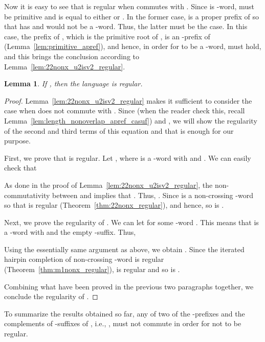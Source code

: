 \documentclass{article}
\theoremstyle{plain}
\newtheorem{lemma}{Lemma}
\theoremstyle{remark}
\begin{document}
Now it is easy to see that  is regular when  commutes with . 
Since  is -word,  must be primitive and  is equal to either  or . 
In the former case,  is a proper prefix of  so that  has  and would not be a -word. 
Thus, the latter must be the case. 
In this case, the prefix  of , which is the primitive root of , is an -prefix of  (Lemma~\ref{lem:primitive_apref}), and hence, in order for  to be a -word,  must hold, and this brings the conclusion according to Lemma~\ref{lem:22nonx_u2isv2_regular}. 

\begin{lemma}
	If , then the language  is regular. 
\end{lemma}
\begin{proof}
	Lemma~\ref{lem:22nonx_u2isv2_regular} makes it sufficient to consider the case when  does not commute with . 
	Since  (when the reader check this, recall Lemma~\ref{lem:length_nonoverlap_apref_casuf}) and , we will show the regularity of the second and third terms of this equation and that is enough for our purpose. 

	First, we prove that  is regular. 
	Let , where  is a -word with  and . 
	We can easily check that 
	
	As done in the proof of Lemma~\ref{lem:22nonx_u2isv2_regular}, the non-commutativity between  and  implies that . 
	Thus, . 
	Since  is a non-crossing -word so that  is regular (Theorem~\ref{thm:22nonx_regular}), and hence, so is . 

	Next, we prove the regularity of . 
	We can let  for some -word . 
	This means that  is a -word with  and the empty -suffix. 
	Thus, 
	
	Using the essentially same argument as above, we obtain . 
	Since the iterated hairpin completion of non-crossing -word is regular (Theorem~\ref{thm:m1nonx_regular}),  is regular and so is . 

	Combining what have been proved in the previous two paragraphs together, we conclude the regularity of . 
\end{proof}

To summarize the results obtained so far, any of two of the -prefixes and the complements of -suffixes of , i.e., , must not commute in order for  not to be regular. 
\end{document}
